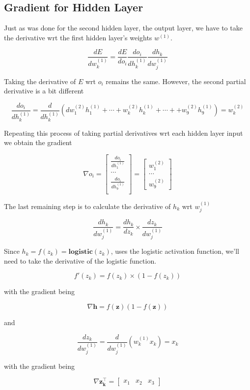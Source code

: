 \documentclass[12pt]{article}%
\begin{document}
\subsection{Gradient for Hidden Layer}


	Just as was done for the second hidden layer, the output layer, we have to take the derivative wrt the first hidden layer's weights $w^{(1)}$.
	
	$$
	\frac{dE}{dw^{(1)}_k} = \frac{dE}{do_i} \frac{do_i}{dh^{(1)}_k} \frac{dh_k}{dw^{(1)}_j}
	$$


	Taking the derivative of $E$ wrt $o_i$ remains the same. However, the second partial derivative is a bit different

	$$
	\frac{do_i}{dh^{(1)}_k} = \frac{d}{dh^{(1)}_k}  (dw^{(2)}_1 h^{(1)}_1+ \cdots + w^{(2)}_k h^{(1)}_k + \cdots + + w^{(2)}_9 h^{(1)}_9)
	= w^{(2)}_k
	$$

	Repeating this process of taking partial derivatives wrt each hidden layer input we obtain the gradient
	
	$$
	\nabla o_i = \begin{bmatrix}
	\frac{do_i}{dh^{(1)}_1} \\ 
	\cdots \\ 
	\frac{do_i}{dh^{(1)}_9} \\ 
	\end{bmatrix}
	= \begin{bmatrix}
	w^{(2)}_1 \\
	\cdots \\
	w^{(2)}_9
	\end{bmatrix}
	$$


	The last remaining step is to calculate the derivative of $h_k$ wrt $w^{(1)}_j$
	
	$$
	\frac{dh_k}{dw^{(1)}_j} = \frac{dh_k}{dz_k} \times \frac{dz_k}{dw^{(1)}_j}
	$$
	
	Since $h_k = f(z_k) = \textbf{logistic}(z_k)$, uses the logistic activation function, we'll need to take the derivative of the logistic function. 
	
	$$
	f'(z_k) = f(z_k) \times (1 - f(z_k))
	$$
	
with the gradient being

	$$
	\nabla \mathbf{h} = f(\mathbf{z}) (1 - f(\mathbf{z}))
	$$

and 

	$$
	\frac{dz_k}{dw^{(1)}_j} = \frac{d}{dw^{(1)}_j} (w^{(1)}_k x_k) = x_k
	$$

with the gradient being

	$$
	\nabla \mathbf{z^\intercal_k} =  \begin{bmatrix}
	x_1 & x_2 & x_3
	\end{bmatrix}
	$$
\end{document}
